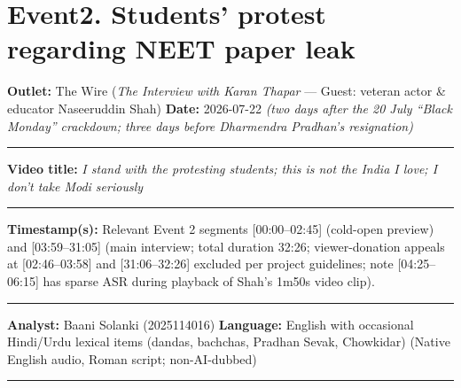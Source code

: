 \documentclass[10pt,a4paper]{article}
\newcommand{\formrule}{\par\vspace{3pt}\noindent\rule{\textwidth}{0.35pt}\par\vspace{7pt}}
\newcommand{\sectionrule}{\par\vspace{4pt}\noindent\rule{\textwidth}{0.4pt}\par\vspace{8pt}}
\begin{document}
\newpage
\section*{Event2. Students' protest regarding NEET paper leak}
\par\vspace{6pt}
{\small
\noindent\textbf{Outlet:} The Wire (\emph{The Interview with Karan Thapar} --- Guest: veteran actor \& educator Naseeruddin Shah) \hfill \textbf{Date:} 2026-07-22 \emph{(two days after the 20 July ``Black Monday'' crackdown; three days before Dharmendra Pradhan's resignation)}
\formrule
\noindent\textbf{Video title:} \emph{I stand with the protesting students; this is not the India I love; I don't take Modi seriously}
\formrule
\noindent\textbf{Timestamp(s):} Relevant Event 2 segments [00:00--02:45] (cold-open preview) and [03:59--31:05] (main interview; total duration 32:26; viewer-donation appeals at [02:46--03:58] and [31:06--32:26] excluded per project guidelines; note [04:25--06:15] has sparse ASR during playback of Shah's 1m50s video clip).
\formrule
\noindent\textbf{Analyst:} Baani Solanki (2025114016) \hfill \textbf{Language:} English with occasional Hindi/Urdu lexical items (dandas, bachchas, Pradhan Sevak, Chowkidar) (Native English audio, Roman script; non-AI-dubbed)
}
\sectionrule
\end{document}
